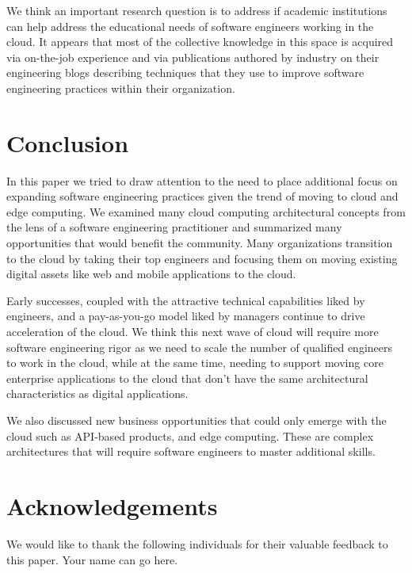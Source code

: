 \documentclass[conference]{IEEEtran}
\begin{document}
We think an important research question is to address if academic institutions can help address the educational needs of software engineers working in the cloud.  It appears that most of the collective knowledge in this space is acquired via on-the-job experience and via publications authored by industry on their engineering blogs describing techniques that they use to improve software engineering practices within their organization.  

\section{Conclusion}
In this paper we tried to draw attention to the need to place additional focus on expanding software engineering practices given the trend of moving to cloud and edge computing.  We examined many cloud computing architectural concepts from the lens of a software engineering practitioner and summarized many opportunities that would benefit the community. Many organizations transition to the cloud by taking their top engineers and focusing them on moving existing digital assets like web and mobile applications to the cloud.

Early successes, coupled with the attractive technical capabilities liked by engineers, and a pay-as-you-go model liked by managers continue to drive acceleration of the cloud.  We think this next wave of cloud will require more software engineering rigor as we need to scale the number of qualified engineers to work in the cloud, while at the same time, needing to support moving core enterprise applications to the cloud that don't have the same architectural characteristics as digital applications. 

We also discussed new business opportunities that could only emerge with the cloud such as API-based products, and edge computing.  These are complex architectures that will require software engineers to master additional skills.

\section{Acknowledgements}
We would like to thank the following individuals for their valuable feedback to this paper. Your name can go here. 


\end{document}
